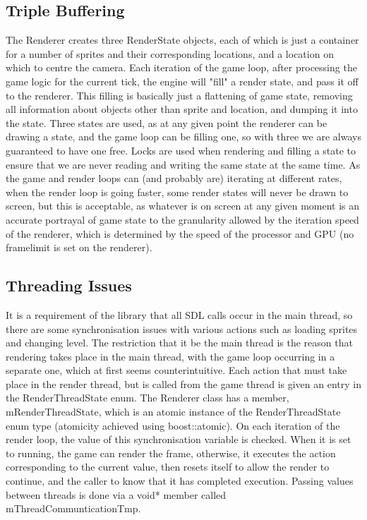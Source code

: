     \subsection{Triple Buffering}
    The Renderer creates three RenderState objects, each of which is just a container for a number of sprites and their corresponding locations, and a location on which to centre the camera.
    Each iteration of the game loop, after processing the game logic for the current tick, the engine will "fill" a render state, and pass it off to the renderer. This filling is basically just a flattening of game state, removing all information about objects other than sprite and location, and dumping it into the state.
    Three states are used, as at any given point the renderer can be drawing a state, and the game loop can be filling one, so with three we are always guaranteed to have one free.
    Locks are used when rendering and filling a state to ensure that we are never reading and writing the same state at the same time.
    As the game and render loops can (and probably are) iterating at different rates, when the render loop is going faster, some render states will never be drawn to screen, but this is acceptable, as whatever is on screen at any given moment is an accurate portrayal of game state to the granularity allowed by the iteration speed of the renderer, which is determined by the speed of the processor and GPU (no framelimit is set on the renderer).
    
    \subsection{Threading Issues}
    It is a requirement of the library that all SDL calls occur in the main thread, so there are some synchronisation issues with various actions such as loading sprites and changing level. The restriction that it be the main thread is the reason that rendering takes place in the main thread, with the game loop occurring in a separate one, which at first seems counterintuitive.
    Each action that must take place in the render thread, but is called from the game thread is given an entry in the RenderThreadState enum. The Renderer class has a member, mRenderThreadState, which is an atomic instance of the RenderThreadState enum type (atomicity achieved using boost::atomic). On each iteration of the render loop, the value of this synchronisation variable is checked. When it is set to running, the game can render the frame, otherwise, it executes the action corresponding to the current value, then resets itself to allow the render to continue, and the caller to know that it has completed execution. Passing values between threads is done via a void* member called mThreadCommunticationTmp.
    
